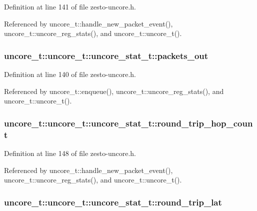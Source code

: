 Definition at line 141 of file zesto-uncore.h.

Referenced by uncore\_\-t::handle\_\-new\_\-packet\_\-event(), uncore\_\-t::uncore\_\-reg\_\-stats(), and uncore\_\-t::uncore\_\-t().
\subsubsection[{packets\_\-out}]{ uncore\_\-t::uncore\_\-t::uncore\_\-stat\_\-t::packets\_\-out}\label{structuncore__t_1_1uncore__stat__t_bdeaa6aa6c887609ccadb689cab34ed9}




Definition at line 140 of file zesto-uncore.h.

Referenced by uncore\_\-t::enqueue(), uncore\_\-t::uncore\_\-reg\_\-stats(), and uncore\_\-t::uncore\_\-t().
\subsubsection[{round\_\-trip\_\-hop\_\-count}]{ uncore\_\-t::uncore\_\-t::uncore\_\-stat\_\-t::round\_\-trip\_\-hop\_\-count}\label{structuncore__t_1_1uncore__stat__t_6f8db16a25a5d2182074cc8306f6257f}




Definition at line 148 of file zesto-uncore.h.

Referenced by uncore\_\-t::handle\_\-new\_\-packet\_\-event(), uncore\_\-t::uncore\_\-reg\_\-stats(), and uncore\_\-t::uncore\_\-t().
\subsubsection[{round\_\-trip\_\-lat}]{ uncore\_\-t::uncore\_\-t::uncore\_\-stat\_\-t::round\_\-trip\_\-lat}\label{structuncore__t_1_1uncore__stat__t_a14d5e15e055f92272c30a097a28daef}




